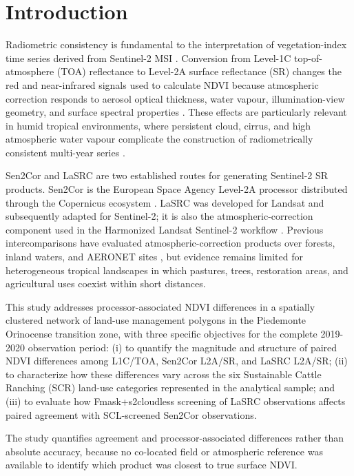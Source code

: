 \documentclass[
  authoryear,
  preprint]{elsarticle}
\begin{document}
\section{Introduction}\label{sec-intro}

Radiometric consistency is fundamental to the interpretation of
vegetation-index time series derived from Sentinel-2 MSI
\citep{Drusch2012}. Conversion from Level-1C top-of-atmosphere (TOA)
reflectance to Level-2A surface reflectance (SR) changes the red and
near-infrared signals used to calculate NDVI because atmospheric
correction responds to aerosol optical thickness, water vapour,
illumination-view geometry, and surface spectral properties
\citep{Doxani2018, Martins2017, Marujo2021}. These effects are
particularly relevant in humid tropical environments, where persistent
cloud, cirrus, and high atmospheric water vapour complicate the
construction of radiometrically consistent multi-year series
\citep{Chraibi2022}.

Sen2Cor and LaSRC are two established routes for generating Sentinel-2
SR products. Sen2Cor is the European Space Agency Level-2A processor
distributed through the Copernicus ecosystem
\citep{MainKnorn2017, ESA2026Sen2Cor}. LaSRC was developed for Landsat
and subsequently adapted for Sentinel-2; it is also the
atmospheric-correction component used in the Harmonized Landsat
Sentinel-2 workflow \citep{Vermote2016, Vermote2018, Claverie2018}.
Previous intercomparisons have evaluated atmospheric-correction products
over forests, inland waters, and AERONET sites
\citep{Martins2017, Marujo2021, Chraibi2022}, but evidence remains
limited for heterogeneous tropical landscapes in which pastures, trees,
restoration areas, and agricultural uses coexist within short distances.

This study addresses processor-associated NDVI differences in a
spatially clustered network of land-use management polygons in the
Piedemonte Orinocense transition zone, with three specific objectives
for the complete 2019-2020 observation period: (i) to quantify the
magnitude and structure of paired NDVI differences among L1C/TOA,
Sen2Cor L2A/SR, and LaSRC L2A/SR; (ii) to characterize how these
differences vary across the six Sustainable Cattle Ranching (SCR)
land-use categories represented in the analytical sample; and (iii) to
evaluate how Fmask+s2cloudless screening of LaSRC observations affects
paired agreement with SCL-screened Sen2Cor observations.

The study quantifies agreement and processor-associated differences
rather than absolute accuracy, because no co-located field or
atmospheric reference was available to identify which product was
closest to true surface NDVI.
\end{document}
